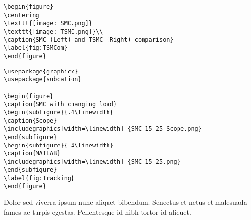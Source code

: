 \documentclass[8pt]{innovativeinnovation-cheatsheet}
\begin{document}
\begin{multicols*}{3}

\begin{lstlisting}
\begin{figure}
\centering
\texttt{[image: SMC.png]}
\texttt{[image: TSMC.png]}\\
\caption{SMC (Left) and TSMC (Right) comparison}
\label{fig:TSMCom}
\end{figure}
\end{lstlisting}



\begin{lstlisting}
\usepackage{graphicx}
\usepackage{subcation}

\begin{figure}
\caption{SMC with changing load}
\begin{subfigure}{.4\linewidth}
\caption{Scope}
\includegraphics[width=\linewidth] {SMC_15_25_Scope.png}
\end{subfigure}
\begin{subfigure}{.4\linewidth}
\caption{MATLAB}
\includegraphics[width=\linewidth] {SMC_15_25.png}
\end{subfigure}
\label{fig:Tracking}
\end{figure}
\end{lstlisting}


Dolor sed viverra ipsum nunc aliquet bibendum. Senectus et netus et malesuada
fames ac turpis egestas. Pellentesque id nibh tortor id aliquet.

\vfill


\end{multicols*}
\end{document}
